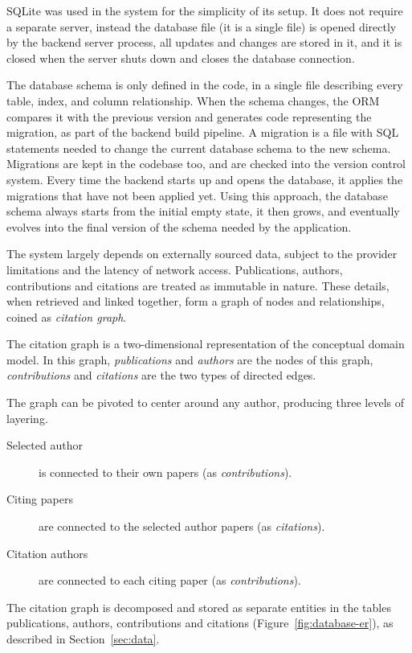 \textsf{SQLite} was used in the system for the simplicity of its setup.
It does not require a separate server, instead the database file (it is a single file) is opened directly by the backend server process, all updates and changes are stored in it, and it is closed when the server shuts down and closes the database connection.

The database schema is only defined in the code, in a single file describing every table, index, and column relationship.
When the schema changes, the ORM compares it with the previous version and generates code representing the migration, as part of the backend build pipeline.
A migration is a file with SQL statements needed to change the current database schema to the new schema.
Migrations are kept in the codebase too, and are checked into the version control system.
Every time the backend starts up and opens the database, it applies the migrations that have not been applied yet.
Using this approach, the database schema always starts from the initial empty state, it then grows, and eventually evolves into the final version of the schema needed by the application.

The system largely depends on externally sourced data, subject to the provider limitations and the latency of network access.
Publications, authors, contributions and citations are treated as immutable in nature.
These details, when retrieved and linked together, form a graph of nodes and relationships, coined as \emph{citation graph}. 

The citation graph is a two-dimensional representation of the conceptual domain model.
In this graph, \emph{publications} and \emph{authors} are the nodes of this graph, \emph{contributions} and \emph{citations} are the two types of directed edges.

The graph can be pivoted to center around any author, producing three levels of layering.

\begin{description}
    \item [Selected author] is connected to their own papers (as \emph{contributions}).
    \item [Citing papers] are connected to the selected author papers (as \emph{citations}).
    \item [Citation authors] are connected to each citing paper (as \emph{contributions}).
\end{description}

The citation graph is decomposed and stored as separate entities in the tables
\textsf{publications}, \textsf{authors}, \textsf{contributions} and \textsf{citations} (Figure~\ref{fig:database-er}), as described in Section~\ref{sec:data}. 

